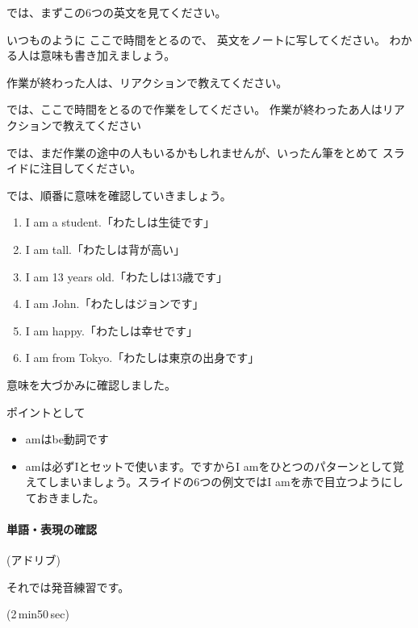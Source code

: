 \documentclass[book,jafontscale=0.9247]{jlreq}
\newcommand{\mySagyo}{%
\par%
\bigskip
では、ここで時間をとるので作業をしてください。
作業が終わったあ人はリアクションで教えてください\par%
\begin{minipage}[t]{.98\textwidth}
\mbox{}\hrulefill\mbox{}\par%
\mbox{}\hfill{}\raisebox{-.5\height}{作業}\hfill\mbox{}\par%
\mbox{}\hrulefill\mbox{}
\end{minipage}%
\par%
\bigskip%
では、まだ作業の途中の人もいるかもしれませんが、いったん筆をとめて
スライドに注目してください。%
\par%
\bigskip
}
\begin{document}
では、まずこの6つの英文を見てください。

いつものように
ここで時間をとるので、
英文をノートに写してください。
わかる人は意味も書き加えましょう。

作業が終わった人は、リアクションで教えてください。

\mySagyo

では、順番に意味を確認していきましょう。


\begin{enumerate}
 \item  I am a student.「わたしは生徒です」
 \item  I am tall.「わたしは背が高い」
 \item  I am 13 years old.「わたしは13歳です」
 \item  I am John.「わたしはジョンです」
 \item  I am happy.「わたしは幸せです」
 \item  I am from Tokyo.「わたしは東京の出身です」
\end{enumerate}

意味を大づかみに確認しました。

ポイントとして
\begin{itemize}
 \item amはbe動詞です
 \item amは必ずIとセットで使います。ですからI amをひとつのパターンとして覚えてしまいましょう。スライドの6つの例文ではI amを赤で目立つようにしておきました。
\end{itemize}


\paragraph{単語・表現の確認}
(アドリブ)

それでは発音練習です。

\faVolumeUp{}(2\,min50\,sec)
\newpage
\end{document}
